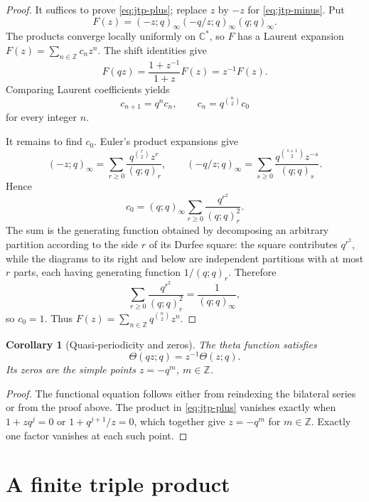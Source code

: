 \documentclass[11pt,oneside,openany]{book}
\newtheorem{corollary}[corollary]{Corollary}
\theoremstyle{definition}
\theoremstyle{remark}
\newcommand{\C}{\mathbb C}
\newcommand{\Z}{\mathbb Z}
\begin{document}
\begin{proof}
It suffices to prove \eqref{eq:jtp-plus}; replace $z$ by $-z$ for \eqref{eq:jtp-minus}.  Put
\[
 F(z)=(-z;q)_\infty(-q/z;q)_\infty(q;q)_\infty.
\]
The products converge locally uniformly on $\C^*$, so $F$ has a Laurent expansion
\(
 F(z)=\sum_{n\in\Z}c_nz^n.
\)
The shift identities give
\[
 F(qz)=\frac{1+z^{-1}}{1+z}F(z)=z^{-1}F(z).
\]
Comparing Laurent coefficients yields
\[
 c_{n+1}=q^nc_n,
 \qquad
 c_n=q^{\binom n2}c_0
\]
for every integer $n$.

It remains to find $c_0$.  Euler's product expansions give
\[
 (-z;q)_\infty=\sum_{r\ge0}\frac{q^{\binom r2}z^r}{(q;q)_r},
 \qquad
 (-q/z;q)_\infty=\sum_{s\ge0}\frac{q^{\binom{s+1}{2}}z^{-s}}{(q;q)_s}.
\]
Hence
\[
 c_0=(q;q)_\infty\sum_{r\ge0}\frac{q^{r^2}}{(q;q)_r^2}.
\]
The sum is the generating function obtained by decomposing an arbitrary partition according to the side $r$ of its Durfee square: the square contributes $q^{r^2}$, while the diagrams to its right and below are independent partitions with at most $r$ parts, each having generating function $1/(q;q)_r$.  Therefore
\[
 \sum_{r\ge0}\frac{q^{r^2}}{(q;q)_r^2}
 =\frac1{(q;q)_\infty},
\]
so $c_0=1$.  Thus
\(
 F(z)=\sum_{n\in\Z}q^{\binom n2}z^n.
\)
\end{proof}

\begin{corollary}[Quasi-periodicity and zeros]\label{cor:theta-quasi}
The theta function satisfies
\[
 \Theta(qz;q)=z^{-1}\Theta(z;q).
\]
Its zeros are the simple points $z=-q^m$, $m\in\Z$.
\end{corollary}

\begin{proof}
The functional equation follows either from reindexing the bilateral series or from the proof above.  The product in \eqref{eq:jtp-plus} vanishes exactly when $1+zq^j=0$ or $1+q^{j+1}/z=0$, which together give $z=-q^m$ for $m\in\Z$.  Exactly one factor vanishes at each such point.
\end{proof}


\section{A finite triple product}
\end{document}
